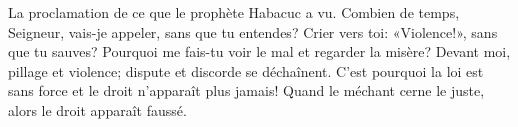 La proclamation de ce que le prophète Habacuc a vu.
Combien de temps, Seigneur, vais-je appeler, sans que tu entendes?
Crier vers toi: «Violence!», sans que tu sauves?
Pourquoi me fais-tu voir le mal et regarder la misère?
Devant moi, pillage et violence; dispute et discorde se déchaînent.
C’est pourquoi la loi est sans force et le droit n’apparaît plus jamais!
	Quand le méchant cerne le juste, alors le droit apparaît faussé.
